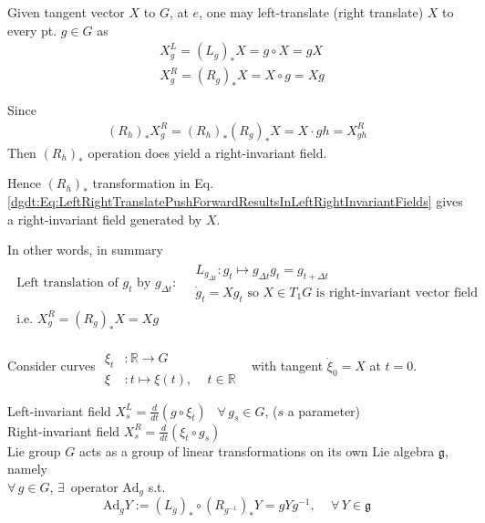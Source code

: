 Given tangent vector $X$ to $G$, at $e$, one may left-translate (right translate) $X$ to every pt. $g\in G$ as 
\begin{equation}\label{dgdt:Eq:LeftRightTranslatePushForwardResultsInLeftRightInvariantFields}
\begin{aligned}
	& X^L_g = (L_g)_* X = g\circ X = gX \\
	& X^R_g = (R_g)_* X = X\circ g = Xg 
\end{aligned}	
\end{equation}

Since
\[
\begin{gathered}
	(R_h)_* X^R_g = (R_h)_*(R_g)_* X = X\cdot gh = X^R_{gh}
\end{gathered}
\]
Then $(R_h)_*$ operation does yield a right-invariant field.

Hence $(R_h)_*$ transformation in Eq. \ref{dgdt:Eq:LeftRightTranslatePushForwardResultsInLeftRightInvariantFields} gives a right-invariant field generated by $X$. 

In other words, in summary
\begin{equation}\label{dgdt:Eq:LeftTranslationRightInvariantVectorField}
\begin{gathered}
\text{ Left translation of  $g_t$ by $g_{\Delta t}$: } \begin{aligned}
& L_{g_{\Delta t}} : g_t \mapsto g_{\Delta t} g_t = g_{t+\Delta t } \\
& \dot{g}_t = X g_t  \text{ so } X \in T_1G \text{ is right-invariant vector field }
\end{aligned} \\
\text{ i.e. } X^R_g = (R_g)_*X = Xg
\end{gathered}
\end{equation}

Consider curves $\begin{aligned} & \quad \\ 
	\xi_t & :   \mathbb{R} \to G \\ 
	\xi  & : t \mapsto \xi(t), \quad \, t\in \mathbb{R} \end{aligned}$ \quad \, with tangent $\dot{\xi}_0 = X$ at $t=0$.

Left-invariant field $X_s^L = \frac{d}{dt} (g\circ \xi_t)$ \quad \, $\forall \, g_s \in G$, ($s$ a parameter) \\
Right-invariant field $X_s^R = \frac{d}{dt} ( \xi_t \circ g_s)$ \\

Lie group $G$ acts as a group of linear transformations on its own Lie algebra $\mathfrak{g}$, namely \\
$\forall \, g\in G$, $\exists \, $ operator $\text{Ad}_g$ s.t. 
\begin{equation}
	\text{Ad}_g Y := (L_g)_* \circ (R_{g^{-1}})_* Y = gYg^{-1}, \quad \, \forall \, Y \in \mathfrak{g}
\end{equation}

